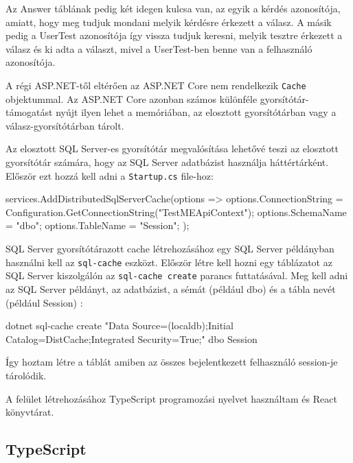Az Answer táblának pedig két idegen kulcsa van, az egyik a kérdés azonosítója, amiatt, hogy meg tudjuk mondani melyik kérdésre érkezett a válasz. A másik pedig a UserTest azonosítója így vissza tudjuk keresni,  melyik tesztre érkezett a válasz és ki adta a választ, mivel a UserTest-ben benne van a felhasználó azonosítója.


A régi ASP.NET-től eltérően az ASP.NET Core nem rendelkezik \lstinline{Cache} objektummal. Az ASP.NET Core azonban számos különféle gyorsítótár-támogatást nyújt ilyen lehet a memóriában, az elosztott gyorsítótárban vagy a válasz-gyorsítótárban tárolt. \newline

Az elosztott SQL Server-es gyorsítótár megvalósítása lehetővé teszi az elosztott gyorsítótár számára, hogy az SQL Server adatbázist használja háttértárként. Először ezt hozzá kell adni a \lstinline{Startup.cs} file-hoz:

\begin{cpp}
    services.AddDistributedSqlServerCache(options => {
        options.ConnectionString =
            Configuration.GetConnectionString("TestMEApiContext");
        options.SchemaName = "dbo";
        options.TableName = "Session";
    });
\end{cpp}

SQL Server gyorsítótárazott cache létrehozásához egy SQL Server példányban használni kell az \lstinline{sql-cache} eszközt. Először létre kell hozni egy táblázatot az SQL Server kiszolgálón az \lstinline{sql-cache create} parancs futtatásával. Meg kell adni az SQL Server példányt, az adatbázist, a sémát (például dbo) és a tábla nevét (például Session) \cite{distributedSQLServerCache}:

\begin{cpp}
    dotnet sql-cache create "Data Source=(localdb)\MSSQLLocalDB;Initial
    Catalog=DistCache;Integrated Security=True;" dbo Session
\end{cpp}

Így hoztam létre a táblát amiben az összes bejelentkezett felhasználó session-je tárolódik.


A felület létrehozásához TypeScript \cite{typescript} programozási nyelvet használtam és React \cite{react} könyvtárat.

\subsection{TypeScript}

